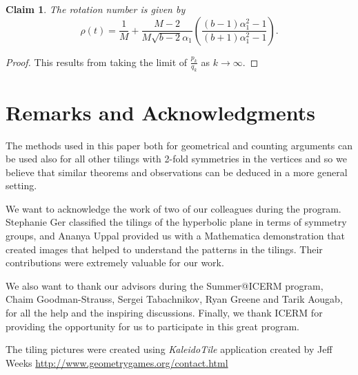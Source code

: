\documentclass[11pt, oneside]{article}   	%
\newtheorem{claim}{Claim}
\begin{document}
\begin{claim}
The rotation number is given by 
$$\rho(t)=\frac{1}{M} + \frac{M-2}{M\sqrt{b-2}\alpha_1}
\left( \frac{(b-1)\alpha_1^2-1}{(b+1)\alpha_1^2-1} \right).$$
\end{claim}
\begin{proof} This results from taking the limit of $\frac{p_k}{q_k}$ as $k \to \infty$.
\end{proof}




\section{Remarks and Acknowledgments}
\indent \indent The methods used in this paper both for geometrical and counting arguments can be used also for all other tilings with 2-fold symmetries in the vertices and so we believe that similar theorems and observations can be deduced in a more general setting. 

We want to acknowledge the work of two of our colleagues during the program. Stephanie Ger classified the tilings of the hyperbolic plane in terms of symmetry groups, and Ananya Uppal provided us with a Mathematica demonstration that created images that helped to understand the  patterns in the tilings. Their contributions were extremely valuable for our work.

We also want to thank our advisors during  the Summer@ICERM program, Chaim Goodman-Strauss, Sergei Tabachnikov, Ryan Greene and Tarik Aougab, for all the help and the inspiring discussions. Finally, we thank ICERM for providing the opportunity for us to participate in this great program. 

The tiling pictures were created using \textit{KaleidoTile} application created by Jeff Weeks \url{http://www.geometrygames.org/contact.html}
\end{document}
